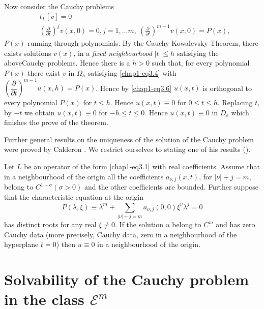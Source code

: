 Now consider the Cauchy problems
\begin{align*}
& t_L [v] = 0\\
& \left(\frac{\partial}{\partial t}\right)^j v(x,  0) = 0,  j = 1,  \ldots m,  ~
  \left(\frac{\partial}{\partial t}\right)^{m-1} v (x,  0) = P (x),  
\end{align*}
$P(x)$ running through polynomials. By the Cauchy Kowalevsky
Theorem, there exists solutions $v(x)$, in a \textit{fixed
  neighbourhood} $| t | \leq h$ satisfying the above\pageoriginale Cauchy
problems. Hence there is a $h > 0$ such that, for every polynomial
$P(x)$ there exist $\underbar{v}$ in $\Omega_h$ satisfying
\eqref{chap1-eq3.4} with 
$\left(\dfrac{\partial}{\partial t}\right)^{m-1} u (x,  h) = P(x)$. Hence by
\eqref{chap1-eq3.6} $u(x, t)$ is orthogonal to every polynomial $P(x)$
for $t \leq h$. Hence $u(x,  t) \equiv 0$ for $0 \leq t \leq h$. Replacing $t$,
by $-t$ we obtain $u(x,  t) \equiv 0$ for $-h \leq t \leq 0$. Hence
$u(x,  t) \equiv 0$ in $D_\varepsilon$ which finishes the prove of the
theorem. 

Further general results on the uniqueness of the solution of the
Cau\-chy problem were proved by Calderon \cite{key1}. We restrict ourselves to 
stating one of his results (\cite{key3}). 

\begin{theorem}[Calderon]\label{chap1-sec3-thm3} %
 Let $L$ be an operator of the form \eqref{chap1-eq3.1} with real
 coefficients. Assume that in a neighbourhood of the origin all the
 coefficients $a_{\nu,  j}(x, t)$, for $|\nu | + j = m$,  belong to
 $C^{1+\sigma}(\sigma > 0)$ and the other coefficients are
 bounded. Further suppose that the  characteristic equation at the
 origin 
\begin{equation}
P(\lambda,  \xi ) \equiv \lambda^m + \sum_{|\nu | + j = m} a_{\nu ,
  j} (0,  0) \xi^\nu \lambda^j = 0 \tag{3.6} \label{chap1-addeq3.6}
\end{equation}
has distinct roots for any real $\xi \neq 0$. If the solution $u$
belong to $C^m$ and has zero Cauchy data (more precisely,  Cauchy
data,  zero in a neighbourhood of the hyperplane $t = 0$) then $u
\equiv 0$ in a neighbourhood of the origin. 
\end{theorem}

\section{Solvability of the Cauchy problem in the class
  $\mathscr{E}^m$}\label{chap1-sec4}%

